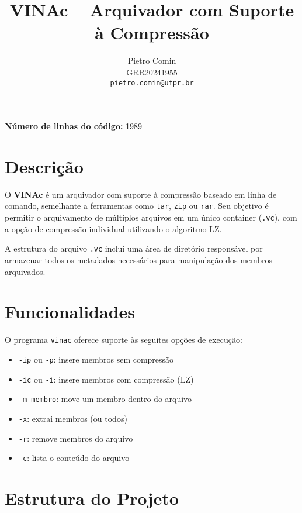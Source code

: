 \documentclass[12pt]{article}
\title{\textbf{VINAc – Arquivador com Suporte à Compressão}}
\author{Pietro Comin \\ GRR20241955 \\ \texttt{pietro.comin@ufpr.br}}
\date{}
\begin{document}
\maketitle

\noindent \textbf{Número de linhas do código:} 1989

\section*{Descrição}

O \textbf{VINAc} é um arquivador com suporte à compressão baseado em linha de comando, semelhante a ferramentas como \texttt{tar}, \texttt{zip} ou \texttt{rar}. Seu objetivo é permitir o arquivamento de múltiplos arquivos em um único container (\texttt{.vc}), com a opção de compressão individual utilizando o algoritmo LZ.

A estrutura do arquivo \texttt{.vc} inclui uma área de diretório responsável por armazenar todos os metadados necessários para manipulação dos membros arquivados.

\section*{Funcionalidades}

O programa \texttt{vinac} oferece suporte às seguites opções de execução:

\begin{itemize}[noitemsep]
    \item \texttt{-ip} ou \texttt{-p}: insere membros sem compressão
    \item \texttt{-ic} ou \texttt{-i}: insere membros com compressão (LZ)
    \item \texttt{-m membro}: move um membro dentro do arquivo
    \item \texttt{-x}: extrai membros (ou todos)
    \item \texttt{-r}: remove membros do arquivo
    \item \texttt{-c}: lista o conteúdo do arquivo
\end{itemize}

\section*{Estrutura do Projeto}
\end{document}
